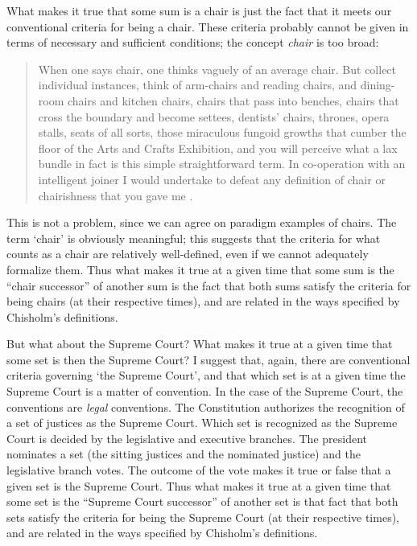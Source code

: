 \documentclass[12pt,twoside]{reedfancy}
\begin{document}
\begin{spacing}{1.25}
What makes it true that some sum is a chair is just the fact that it
meets our conventional criteria for being a chair.  These criteria
probably cannot be given in terms of necessary and sufficient
conditions; the concept {\em chair} is too broad:

\begin{quote}
When one says chair, one thinks vaguely of an average chair.  But
collect individual instances, think of arm-chairs and reading chairs,
and dining-room chairs and kitchen chairs, chairs that pass into
benches, chairs that cross the boundary and become settees, dentists'
chairs, thrones, opera stalls, seats of all sorts, those miraculous
fungoid growths that cumber the floor of the Arts and Crafts
Exhibition, and you will perceive what a lax bundle in fact is this
simple straightforward term.  In co-operation with an intelligent
joiner I would undertake to defeat any definition of chair or
chairishness that you gave me \citep[384--385]{wells1904}.
\end{quote}
This is not a problem, since we can agree on paradigm examples of
chairs.  The term `chair' is obviously meaningful; this suggests that
the criteria for what counts as a chair are relatively well-defined,
even if we cannot adequately formalize them.  Thus what makes it true
at a given time that some sum is the ``chair successor'' of another
sum is the fact that both sums satisfy the criteria for being chairs
(at their respective times), and are related in the ways specified by
Chisholm's definitions.

But what about the Supreme Court?  What makes it true at a given time
that some set is then the Supreme Court?  I suggest that, again, there
are conventional criteria governing `the Supreme Court', and that
which set is at a given time the Supreme Court is a matter of
convention.  In the case of the Supreme Court, the conventions are
{\em legal} conventions.  The Constitution authorizes the recognition
of a set of justices as the Supreme Court.  Which set is recognized as
the Supreme Court is decided by the legislative and executive
branches.  The president nominates a set (the sitting justices and the
nominated justice) and the legislative branch votes.  The outcome of
the vote makes it true or false that a given set is the Supreme Court.
Thus what makes it true at a given time that some set is the ``Supreme
Court successor'' of another set is that fact that both sets satisfy
the criteria for being the Supreme Court (at their respective times),
and are related in the ways specified by Chisholm's definitions.


\end{spacing}
\end{document}
